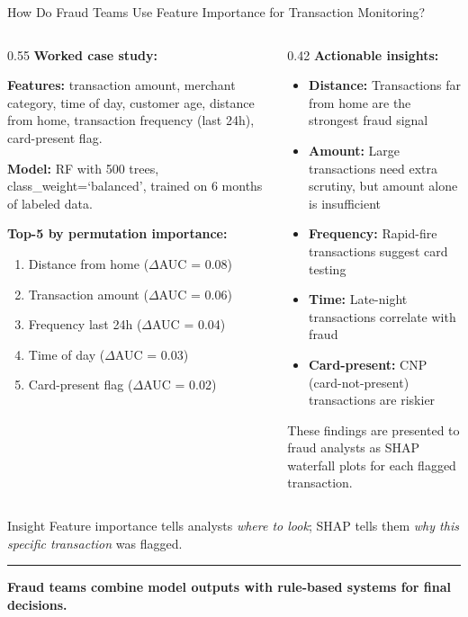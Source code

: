 \documentclass[8pt,aspectratio=169]{beamer}
\newcommand{\bottomnote}[1]{%
\vfill
\vspace{-2mm}
\textcolor{mllavender2}{\rule{\textwidth}{0.4pt}}
\vspace{1mm}
\footnotesize
\textbf{#1}
}
\newenvironment{compactlist}{%
  \begin{itemize}%
    \setlength{\itemsep}{2pt}%
    \setlength{\parskip}{0pt}%
    \setlength{\parsep}{0pt}%
}{%
  \end{itemize}%
}
\begin{document}
\begin{frame}{How Do Fraud Teams Use Feature Importance for Transaction Monitoring?}
\begin{columns}[T]
\begin{column}{0.55\textwidth}
\small
\textbf{Worked case study:}

\vspace{0.2em}
\footnotesize
\textbf{Features:} transaction amount, merchant category, time of day, customer age, distance from home, transaction frequency (last 24h), card-present flag.

\vspace{0.3em}
\textbf{Model:} RF with 500 trees, class\_weight=`balanced', trained on 6 months of labeled data.

\vspace{0.3em}
\textbf{Top-5 by permutation importance:}
\begin{enumerate}
\setlength{\itemsep}{1pt}
\item Distance from home ($\Delta$AUC = 0.08)
\item Transaction amount ($\Delta$AUC = 0.06)
\item Frequency last 24h ($\Delta$AUC = 0.04)
\item Time of day ($\Delta$AUC = 0.03)
\item Card-present flag ($\Delta$AUC = 0.02)
\end{enumerate}
\end{column}
\begin{column}{0.42\textwidth}
\footnotesize
\textbf{Actionable insights:}
\begin{compactlist}
\item \textbf{Distance:} Transactions far from home are the strongest fraud signal
\item \textbf{Amount:} Large transactions need extra scrutiny, but amount alone is insufficient
\item \textbf{Frequency:} Rapid-fire transactions suggest card testing
\item \textbf{Time:} Late-night transactions correlate with fraud
\item \textbf{Card-present:} CNP (card-not-present) transactions are riskier
\end{compactlist}

\vspace{0.5em}
\scriptsize These findings are presented to fraud analysts as SHAP waterfall plots for each flagged transaction.
\end{column}
\end{columns}

\begin{block}{Insight}
\scriptsize Feature importance tells analysts \emph{where to look}; SHAP tells them \emph{why this specific transaction} was flagged.
\end{block}
\bottomnote{Fraud teams combine model outputs with rule-based systems for final decisions.}
\end{frame}
\end{document}
